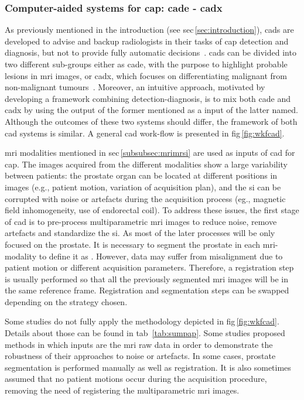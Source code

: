 \subsubsection{Computer-aided systems for \ac{cap}: \ac{cade} - \ac{cadx}} \label{subsubsec:CAD}

As previously mentioned in the introduction (see \acs{sec}\,\ref{sec:introduction}), \acp{cad} are developed to advise and backup radiologists in their tasks of \ac{cap} detection and diagnosis, but not to provide fully automatic decisions~\cite{Giger2008}. \acp{cad} can be divided into two different sub-groups either as \ac{cade}, with the purpose to highlight probable lesions in \ac{mri} images, or \ac{cadx}, which focuses on differentiating malignant from non-malignant tumours~\cite{Giger2008}. Moreover, an intuitive approach, motivated by developing a framework combining detection-diagnosis, is to mix both \ac{cade} and \ac{cadx} by using the output of the former mentioned as a input of the latter named. Although the outcomes of these two systems should differ, the framework of both \ac{cad} systems is similar. A general \ac{cad} work-flow is presented in \acs{fig}\,\ref{fig:wkfcad}.

\ac{mri} modalities mentioned in \acs{sec}\,\ref{subsubsec:mrimrsi} are used as inputs of \ac{cad} for \ac{cap}. The images acquired from the different modalities show a large variability between patients: the prostate organ can be located at different positions in images (e.g., patient motion, variation of acquisition plan), and the \ac{si} can be corrupted with noise or artefacts during the acquisition process (eg., magnetic field inhomogeneity, use of endorectal coil). To address these issues, the first stage of \ac{cad} is to pre-process multiparametric \ac{mri} images to reduce noise, remove artefacts and standardize the \ac{si}. As most of the later processes will be only focused on the prostate. It is necessary to segment the prostate in each \ac{mri}-modality to define it as . However, data may suffer from misalignment due to patient motion or different acquisition parameters. Therefore, a registration step is usually performed so that all the previously segmented \ac{mri} images will be in the same reference frame. Registration and segmentation steps can be swapped depending on the strategy chosen.

Some studies do not fully apply the methodology depicted in \acs{fig}\,\ref{fig:wkfcad}. Details about those can be found in \acs{tab}~\ref{tab:sumpap}. Some studies proposed methods in which inputs are the \ac{mri} raw data in order to demonstrate the robustness of their approaches to noise or artefacts. In some cases, prostate segmentation is performed manually as well as registration. It is also sometimes assumed that no patient motions occur during the acquisition procedure, removing the need of registering the multiparametric \ac{mri} images.

